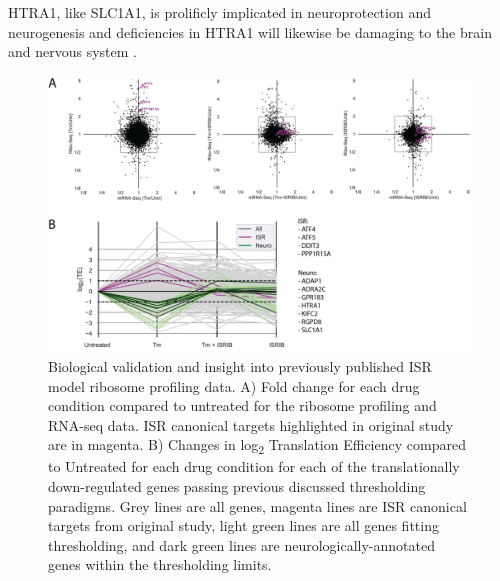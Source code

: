 \documentclass[11pt, a4paper, oneside]{article}
\begin{document}
HTRA1, like SLC1A1, is prolificly implicated in neuroprotection and neurogenesis and deficiencies in HTRA1 will likewise be damaging to the brain and nervous system \cite{htra1_neurotoxic1, htra1_neurotoxic2}.




\begin{figure}
\centering
  \includegraphics[width=180mm]{figures/xpresspipe_figure3.png}
  \caption{Biological validation and insight into previously published ISR model ribosome profiling data. A) Fold change for each drug condition compared to untreated for the ribosome profiling and RNA-seq data. ISR canonical targets highlighted in original study are in magenta. B) Changes in log\textsubscript{2} Translation Efficiency compared to Untreated for each drug condition for each of the translationally down-regulated genes passing previous discussed thresholding paradigms. Grey lines are all genes, magenta lines are ISR canonical targets from original study, light green lines are all genes fitting thresholding, and dark green lines are neurologically-annotated genes within the thresholding limits.}
  \label{fig:figure3}
\end{figure}
\end{document}
